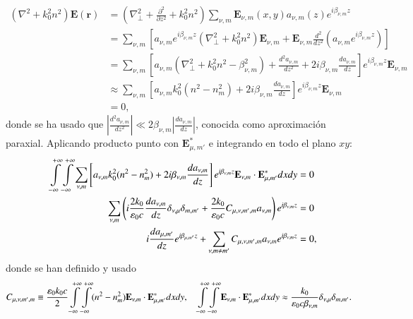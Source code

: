 \begin{align}
	(\nabla^2  + k_0^2n^2) \textbf{E}(\textbf{r}) &= \left(\nabla_\perp^2 + \frac{\partial^2}{\partial z^2} + k_0^2n^2 \right)\sum_{\nu, m} \textbf{E}_{\nu, m}(x, y) a_{\nu, m}(z) e^{i\beta_{\nu, m} z}
	\nonumber
	\\
	&= \sum_{\nu, m} \left[a_{\nu, m} e^{i\beta_{\nu, m} z} \left(\nabla_\perp^2 +k_0^2n^2 \right)\textbf{E}_{\nu, m} + \textbf{E}_{\nu, m}\frac{d^2}{d z^2}\left(a_{\nu, m} e^{i\beta_{\nu, m} z}\right)\right]
	\nonumber	
	\\
	&= \sum_{\nu, m} \left[a_{\nu, m}  \left(\nabla_\perp^2 +k_0^2n^2 -\beta_{\nu,m}^2 \right) + \frac{d^2 a_{\nu, m}}{d z^2}  +2i\beta_{\nu,m}\frac{d a_{\nu, m}}{d z} \right]e^{i\beta_{\nu, m} z}\textbf{E}_{\nu, m}
		\nonumber	
	\\
	&\approx \sum_{\nu, m} \left[a_{\nu, m}  k_0^2(n^2 - n^2_{m}) +2i\beta_{\nu,m}\frac{d a_{\nu, m}}{d z} \right]e^{i\beta_{\nu, m} z}\textbf{E}_{\nu, m}
	\nonumber	
	\\
	&= 0,
	\nonumber	
\end{align}
donde se ha usado que $\left|\frac{d^2 a_{\nu, m}}{d z^2}\right|\ll 2\beta_{\nu,m}\left|\frac{d a_{\nu, m}}{d z}\right|  $, conocida como aproximación paraxial. Aplicando producto punto con $\textbf{E}_{\mu, m'}^*$ e integrando en todo el plano $xy$:
\begin{align}
	  \int\displaylimits_{-\infty}^{+\infty}\int\displaylimits_{-\infty}^{+\infty} \sum_{\nu, m} \left[a_{\nu, m}  k_0^2(n^2 - n^2_{m}) +2i\beta_{\nu,m}\frac{d a_{\nu, m}}{d z} \right]e^{i\beta_{\nu, m} z}\textbf{E}_{\nu, m} \cdot \textbf{E}_{\mu, m'}^* dxdy &= 0
	  \nonumber
	  \\
	  \sum_{\nu, m} \left(i\frac{2k_0}{\epsilon_0 c}\frac{d a_{\nu, m}}{d z} \delta_{\nu,\mu}\delta_{m,m'} +  \frac{2k_0}{\epsilon_0 c}C_{\mu, \nu, m', m}   a_{\nu, m} \right)e^{i\beta_{\nu, m} z} &= 0
	  \nonumber
	  \\
	  	  i\frac{d a_{\mu, m'}}{d z} e^{i\beta_{\mu, m'} z} +  \sum_{\nu, m\neq m'}C_{\mu, \nu, m', m}   a_{\nu, m} e^{i\beta_{\nu, m} z} &= 0,
	  	  \nonumber
\end{align}
donde se han definido y usado
\begin{align*}
	   C_{\mu, \nu, m', m} &\equiv \frac{\epsilon_0 k_0 c}{2}\int\displaylimits_{-\infty}^{+\infty}\int\displaylimits_{-\infty}^{+\infty} (n^2 - n^2_{m}) \textbf{E}_{\nu, m} \cdot \textbf{E}_{\mu, m'}^* dxdy , \quad\int\displaylimits_{-\infty}^{+\infty}\int\displaylimits_{-\infty}^{+\infty} \textbf{E}_{\nu, m} \cdot \textbf{E}_{\mu, m'}^* dxdy \approx \frac{k_0}{\epsilon_0 c \beta_{\nu, m}} \delta_{\nu,\mu}\delta_{m,m'}.
\end{align*}

